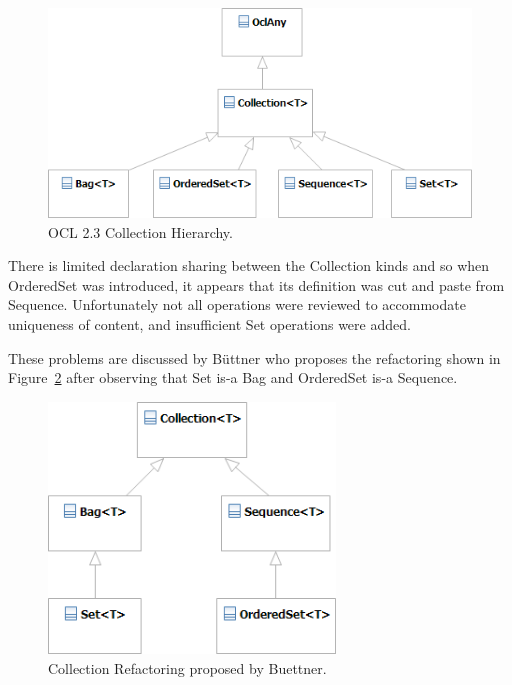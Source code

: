 \documentclass{eceasst}
\begin{document}
\begin{figure}
  \begin{center}
    \includegraphics[width=5.0in]{Collections_2_2.png}
  \end{center}
  \caption{OCL 2.3 Collection Hierarchy.}
  \label{fig:Collections_2_2}
\end{figure}

There is limited declaration sharing between the Collection kinds and so when OrderedSet was introduced, it appears that its definition was cut and paste from Sequence. Unfortunately not all operations were reviewed to accommodate uniqueness of content, and insufficient Set operations were added. 

These problems are discussed by B\"{u}ttner\cite{Buettner} who proposes the refactoring shown in Figure~\ref{fig:Collections_Buettner} after observing that Set is-a Bag and OrderedSet is-a Sequence.

\begin{figure}
  \begin{center}
    \includegraphics[width=3.0in]{Collections_Buettner.png}
  \end{center}
  \caption{Collection Refactoring proposed by Buettner.}
  \label{fig:Collections_Buettner}
\end{figure}
\end{document}
